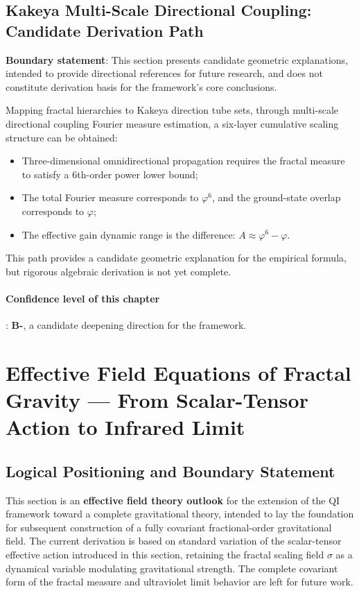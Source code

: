 \documentclass[12pt,a4paper,twocolumn]{article}
\renewcommand{\phi}{\varphi}
\begin{document}
\subsection{Kakeya Multi-Scale Directional Coupling: Candidate Derivation Path}
\textbf{Boundary statement}: This section presents candidate geometric explanations, intended to provide directional references for future research, and does not constitute derivation basis for the framework's core conclusions.

Mapping fractal hierarchies to Kakeya direction tube sets, through multi-scale directional coupling Fourier measure estimation, a six-layer cumulative scaling structure can be obtained:
\begin{itemize}
\item Three-dimensional omnidirectional propagation requires the fractal measure to satisfy a 6th-order power lower bound;
\item The total Fourier measure corresponds to $\phi^6$, and the ground-state overlap corresponds to $\phi$;
\item The effective gain dynamic range is the difference: $A \approx \phi^6 - \phi$.
\end{itemize}
This path provides a candidate geometric explanation for the empirical formula, but rigorous algebraic derivation is not yet complete.

\paragraph{Confidence level of this chapter}: \textbf{B-}, a candidate deepening direction for the framework.

\section{Effective Field Equations of Fractal Gravity --- From Scalar-Tensor Action to Infrared Limit}
\label{sec:effective_gravity}

\subsection{Logical Positioning and Boundary Statement}
This section is an \textbf{effective field theory outlook} for the extension of the QI framework toward a complete gravitational theory, intended to lay the foundation for subsequent construction of a fully covariant fractional-order gravitational field. The current derivation is based on standard variation of the scalar-tensor effective action introduced in this section, retaining the fractal scaling field $\sigma$ as a dynamical variable modulating gravitational strength. The complete covariant form of the fractal measure and ultraviolet limit behavior are left for future work.
\end{document}
